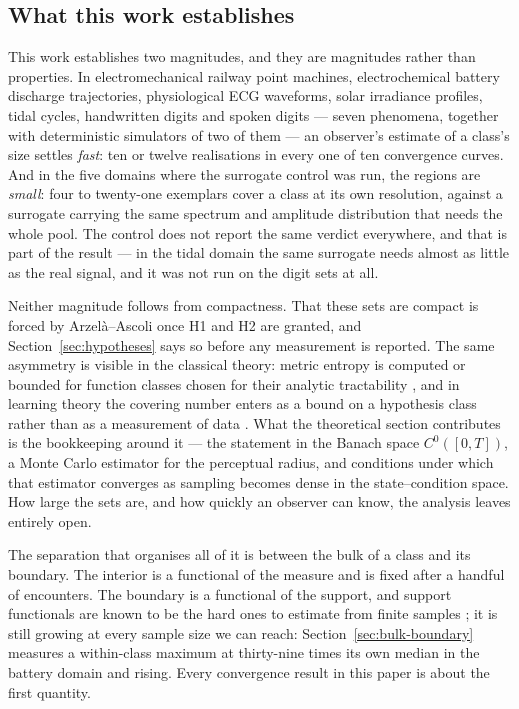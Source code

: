 \documentclass[10pt]{article}
\theoremstyle{plain}
\theoremstyle{definition}
\theoremstyle{remark}
\begin{document}
\subsection{What this work establishes}

This work establishes two magnitudes, and they are magnitudes rather than
properties. In electromechanical railway point
machines, electrochemical battery discharge trajectories, physiological ECG
waveforms, solar irradiance profiles, tidal cycles, handwritten digits and
spoken digits --- seven phenomena, together with deterministic simulators of
two of them --- an observer's estimate of a class's size settles \emph{fast}:
ten or twelve realisations in every one of ten convergence curves. And in the
five domains where the surrogate control was run, the regions are \emph{small}:
four to twenty-one exemplars cover a class at its own resolution, against a
surrogate carrying the same spectrum and amplitude distribution that needs the
whole pool. The control does not report the same verdict everywhere, and that is
part of the result --- in the tidal domain the same surrogate needs almost as
little as the real signal, and it was not run on the digit sets at all.

Neither magnitude follows from compactness. That these sets are compact is
forced by Arzel\`a--Ascoli once H1 and H2 are granted, and
Section~\ref{sec:hypotheses} says so before any measurement is reported. The
same asymmetry is visible in the classical theory: metric entropy is computed
or bounded for function classes chosen for their analytic tractability
\citep{kolmogorov1993entropy, dudley1967sizes}, and in learning theory the
covering number enters as a bound on a hypothesis class rather than as a
measurement of data \citep{cucker2001mathematical, zhou2002covering}. What
the theoretical section contributes is the bookkeeping around it --- the
statement in the Banach space $C^0([0,T])$, a Monte Carlo estimator for the
perceptual radius, and conditions under which that estimator converges as
sampling becomes dense in the state--condition space. How large the sets are,
and how quickly an observer can know, the analysis leaves entirely open.

The separation that organises all of it is between the bulk of a class and its
boundary. The interior is a functional of the measure and is fixed after a
handful of encounters. The boundary is a functional of the support, and support
functionals are known to be the hard ones to estimate from finite samples
\citep{devroye1980detection, scholkopf2001estimating}; it is still growing at
every sample size we can reach:
Section~\ref{sec:bulk-boundary} measures a within-class maximum at
thirty-nine times its own median in the battery domain and rising. Every
convergence result in this paper is about the first quantity.
\end{document}
